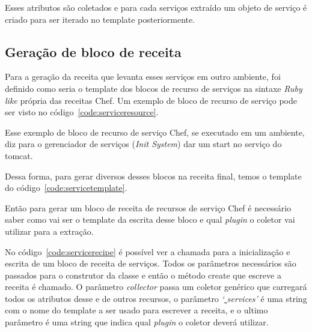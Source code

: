 Esses atributos são coletados e para cada serviços extraído um objeto de serviço
é criado para ser iterado no template posteriormente.

\subsection{Geração de bloco de receita}
Para a geração da receita que levanta esses serviços em outro ambiente, foi 
definido como seria o template dos blocos de recurso de serviços na sintaxe 
\textit{Ruby like} própria das receitas Chef. Um exemplo de bloco de recurso de serviço pode ser visto no código~\ref{code:serviceresource}.

\noindent\begin{minipage}{\textwidth}
  \lstset{style=shell}
  
\end{minipage}\hfill

Esse exemplo de bloco de recurso de serviço Chef, se executado em um ambiente, diz para o
gerenciador de serviços (\textit{Init System}) dar um start no serviço do tomcat.

Dessa forma, para gerar diversos desses blocos na receita final, temos o template
do código~\ref{code:servicetemplate}.

\noindent\begin{minipage}{\textwidth}
  \lstset{style=shell}
  
\end{minipage}\hfill

Então para gerar um bloco de receita de recursos de serviço Chef é necessário
saber como vai ser o template da escrita desse bloco e qual \textit{plugin} o
coletor vai utilizar para a extração.

No código~\ref{code:servicerecipe} é possível ver a chamada para a inicialização e escrita de um
bloco de receita de serviços. Todos os parâmetros necessários são passados para
o construtor da classe e então o método create que escreve a receita é chamado.
O parâmetro \textit{collector} passa um coletor genérico que carregará todos os
atributos desse e de outros recursos, o parâmetro \textit{`\underline{ }services'} é uma
string com o nome do template a ser usado para escrever a receita, e o ultimo
parâmetro é uma string que indica qual \textit{plugin} o coletor deverá utilizar.

